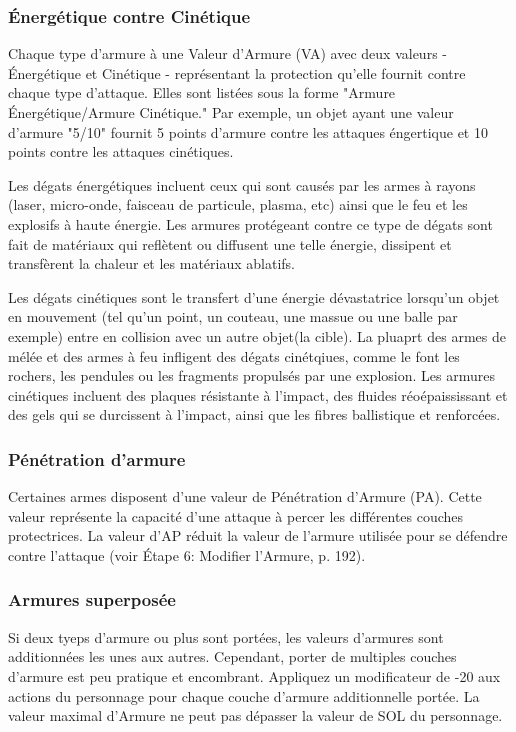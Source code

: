 \subsubsection{Énergétique contre Cinétique} 

Chaque type d'armure à une Valeur d'Armure (VA) avec deux valeurs - Énergétique et Cinétique - représentant la protection qu'elle fournit contre chaque type d'attaque. Elles sont listées sous la forme "Armure Énergétique/Armure Cinétique." Par exemple, un objet ayant une valeur d'armure "5/10" fournit 5 points d'armure contre les attaques éngertique et 10 points contre les attaques cinétiques. 

Les dégats énergétiques incluent ceux qui sont causés par les armes à rayons (laser, micro-onde, faisceau de particule, plasma, etc) ainsi que le feu et les explosifs à haute énergie. Les armures protégeant contre ce type de dégats sont fait de matériaux qui reflètent ou diffusent une telle énergie, dissipent et transfèrent la chaleur et les matériaux ablatifs. 

Les dégats cinétiques sont le transfert d'une énergie dévastatrice lorsqu'un objet en mouvement (tel qu'un point, un couteau, une massue ou une balle par exemple) entre en collision avec un autre objet(la cible). La pluaprt des armes de mélée et des armes à feu infligent des dégats cinétqiues, comme le font les rochers, les pendules ou les fragments propulsés par une explosion. Les armures cinétiques incluent des plaques résistante à l'impact, des fluides réoépaississant et des gels qui se durcissent à l'impact, ainsi que les fibres ballistique et renforcées. 

\subsubsection{Pénétration d'armure} 

Certaines armes disposent d'une valeur de Pénétration d'Armure (PA). Cette valeur représente la capacité d'une attaque à percer les différentes couches protectrices. La valeur d'AP réduit la valeur de l'armure utilisée pour se défendre contre l'attaque (voir Étape 6: Modifier l'Armure, p. 192). 

\subsubsection{Armures superposée} 

Si deux tyeps d'armure ou plus sont portées, les valeurs d'armures sont additionnées les unes aux autres. Cependant, porter de multiples couches d'armure est peu pratique et encombrant. Appliquez un modificateur de -20 aux actions du personnage pour chaque couche d'armure additionnelle portée. La valeur maximal d'Armure ne peut pas dépasser la valeur de SOL du personnage.


